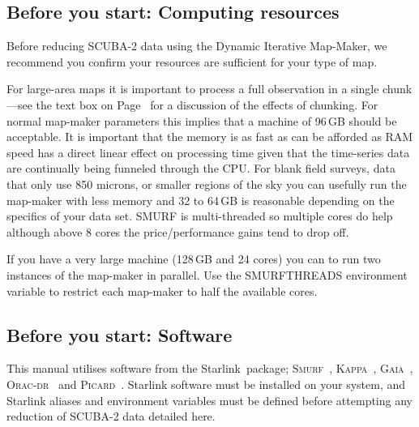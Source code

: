 \documentclass[twoside,11pt]{article}
\newcommand{\htmladdnormallink}[2]{#1}
\newcommand{\htmlref}[2]{#1}
\newcommand{\latexhtml}[2]{#1}
\newcommand{\xref}[3]{#1}
\newcommand{\xlabel}[1]{}
\renewcommand{\_}{\texttt{\symbol{95}}}
\newcommand{\starlink}{\htmladdnormallink{Starlink}{http://starlink.jach.hawaii.edu}}
\newcommand{\gaia}{\xref{\textsc{Gaia}}{sun214}{}}
\newcommand{\Kappa}{\xref{\textsc{Kappa}}{sun95}{}}
\newcommand{\oracdr}{\htmladdnormallink{\textsc{Orac-dr}}{http://www.oracdr.org/oracdr}}
\newcommand{\picard}{\xref{\textsc{Picard}}{sun265}{}}
\newcommand{\smurf}{\xref{\textsc{Smurf}}{sun258}{}}
\begin{document}
\subsection{\xlabel{computing}Before you start: Computing resources}

Before reducing SCUBA-2 data using the Dynamic Iterative Map-Maker, we
recommend you confirm your resources are sufficient for your type of
map.

For large-area maps it is important to process a full observation in a
single chunk---see the text box on
\latexhtml{Page~\pageref{page:text}}{\htmlref{What to look
for}{box:chunk}} for a
discussion of the effects of chunking. For normal map-maker parameters
this implies that a machine of 96\,GB should be acceptable. It is
important that the memory is as fast as can be afforded as RAM speed
has a direct linear effect on processing time given that the
time-series data are continually being funneled through the CPU. For
blank field surveys, data that only use 850 microns, or smaller
regions of the sky you can usefully run the map-maker with less memory
and 32 to 64\,GB is reasonable depending on the specifics of your data
set. SMURF is multi-threaded so multiple cores do help although above
8 cores the price/performance gains tend to drop off.

If you have a very large machine (128\,GB and 24 cores) you can to run
two instances of the map-maker in parallel. Use the SMURF\_THREADS
environment variable to restrict each map-maker to half the available
cores.


\subsection{\xlabel{software}Before you start: Software}

This manual utilises software from the \starlink\ package;
\smurf\ \cite{smurf}, \Kappa\ \cite{kappa}, \gaia\ \cite{gaia}, \oracdr\ \cite{oracdr} and
\picard\ \cite{picard}. Starlink software must be installed on your system, and Starlink aliases
and environment variables must be defined before attempting any
reduction of SCUBA-2 data detailed here.
\end{document}
